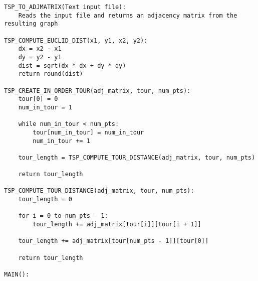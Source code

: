 \documentclass[../report/main.tex]{subfiles}
\begin{document}
\begin{verbatim}
TSP_TO_ADJMATRIX(Text input file):
    Reads the input file and returns an adjacency matrix from the resulting graph

TSP_COMPUTE_EUCLID_DIST(x1, y1, x2, y2):
    dx = x2 - x1
    dy = y2 - y1
    dist = sqrt(dx * dx + dy * dy)
    return round(dist)

TSP_CREATE_IN_ORDER_TOUR(adj_matrix, tour, num_pts):
    tour[0] = 0
    num_in_tour = 1

    while num_in_tour < num_pts:
        tour[num_in_tour] = num_in_tour
        num_in_tour += 1

    tour_length = TSP_COMPUTE_TOUR_DISTANCE(adj_matrix, tour, num_pts)

    return tour_length

TSP_COMPUTE_TOUR_DISTANCE(adj_matrix, tour, num_pts):
    tour_length = 0

    for i = 0 to num_pts - 1:
        tour_length += adj_matrix[tour[i]][tour[i + 1]]

    tour_length += adj_matrix[tour[num_pts - 1]][tour[0]]

    return tour_length

MAIN():
    
\end{verbatim}
\end{document}
